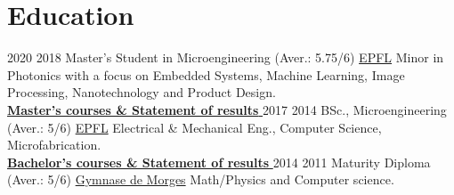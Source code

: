 \documentclass[a4paper]{twentysecondcv} %
\begin{document}
\makeprofile %

\hfill {} 
\vspace*{-0.3cm}
\section{Education}
\vspace*{-0.1cm}

\begin{twenty} %
    \twentyitem
    	{2020}
        {2018}
        {Master's Student in Microengineering \textnormal{(Aver.: 5.75/6)}}
        {\href{https://www.epfl.ch/education/master/programs/microengineering/}{EPFL}}
        {
        Minor in Photonics with a focus on Embedded Systems, Machine Learning, Image Processing, Nanotechnology and Product Design.\\\null\hfill\href{http://fdeg.ch/CV/EPFL_Results/Master_Statement_of_Results.pdf}{\textbf{Master's courses \& Statement of results \mpoint}} 
        }
        {}
	\twentyitem
    	{2017}
        {2014}
        {BSc., Microengineering \textnormal{(Aver.: 5/6)}}
        {\href{https://bachelor.epfl.ch/microtechnique}{EPFL}}
        {
        Electrical \& Mechanical Eng., Computer Science, Microfabrication.\\\null\hfill\href{http://fdeg.ch/CV/EPFL_Results/Bachelor_Statement_of_Results.pdf}{\textbf{Bachelor's courses \& Statement of results \mpoint}}
        }
        {}
    \twentyitem
    	{2014}
        {2011}
        {Maturity Diploma \textnormal{(Aver.: 5/6)}}
        {\href{https://www.gymnase-morges.ch/}{Gymnase de Morges}}
        {
        Math/Physics and Computer science.
        }
        {}
\end{twenty}

\vspace*{-0.3cm}
\end{document}

